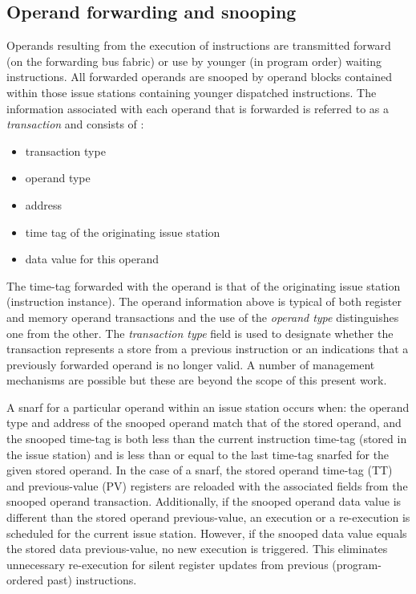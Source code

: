 \documentclass[10pt,twocolumn,dvips]{article}
\begin{document}
\subsection{Operand forwarding and snooping}
%
Operands resulting from the execution of instructions
are transmitted forward (on the forwarding bus fabric)
or use by younger (in program order) waiting instructions.
All forwarded operands are snooped by operand blocks
contained within those issue stations containing younger
dispatched instructions.
The information associated with each operand that is
forwarded is referred
to as a {\em transaction} and consists of :
%
\begin{itemize}
\vspace{-0.10in}
\item{transaction type}
\vspace{-0.10in}
\item{operand type}
\vspace{-0.10in}
\item{address}
\vspace{-0.10in}
\item{time tag of the originating issue station}
\vspace{-0.10in}
\item{data value for this operand}
\vspace{-0.10in}
\end{itemize}   
%
The time-tag forwarded with the operand is that of the originating
issue station (instruction instance).
The operand information above is typical of both
register and memory operand transactions and the use
of the \textit{operand type} distinguishes one from the other.
The \textit{transaction type} field is used to 
designate whether the transaction represents a store from
a previous instruction or an indications that
a previously forwarded operand is no longer valid.
A number of management mechanisms are possible but
these are beyond the scope of this present work.

A snarf for a particular operand
within an issue station occurs when: the operand type and address
of the snooped operand match that of the stored operand, and
the snooped time-tag is both less than the current instruction
time-tag (stored in the issue station) and is less than or
equal to the last time-tag snarfed for the given stored operand.
In the case of a snarf, the stored operand time-tag (TT) and
previous-value (PV) registers are reloaded with the associated
fields from the snooped operand transaction.
Additionally, if the snooped operand data value is different
than the stored operand previous-value, an execution or a re-execution
is scheduled for the current issue station.
However, if the snooped data value equals the stored
data previous-value, no new execution is triggered.
This eliminates unnecessary re-execution for silent register updates
from previous (program-ordered past) instructions.
\end{document}
